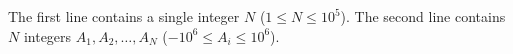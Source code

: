 The first line contains a single integer $N$ ($1 \le N \le 10^5$).
The second line contains $N$ integers $A_1, A_2, \dots, A_N$ ($-10^6 \le A_i \le 10^6$).
